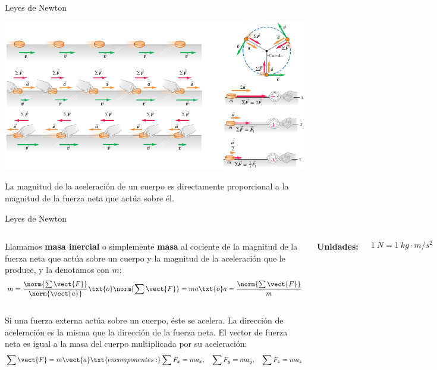 \documentclass[9pt, aspectratio=169]{beamer}
\begin{document}
\begin{frame}{Leyes de Newton}
    \begin{center} 
        \includegraphics[scale=0.90]{figs/fig-06.pdf}

        La magnitud de la aceleración de un cuerpo es directamente proporcional a la magnitud de la fuerza neta que actúa sobre él.
    \end{center}
\end{frame}

\begin{frame}{Leyes de Newton}
\begin{columns}
\cx 
\begin{definition}[Masa]
    Llamamos \textbf{masa inercial} o simplemente \textbf{masa} al cociente de la magnitud de la fuerza neta que actúa sobre un cuerpo y la magnitud de la aceleración que le produce, y la denotamos con $m$:
    \[ m = \frac{\norm{\sum \vect{F}}}{\norm{\vect{a}}} \txt{o} \norm{\sum \vect{F}} = m a \txt{o} a = \frac{\norm{\sum \vect{F}}}{m} \]
\end{definition}
\cx 
\textbf{Unidades:}

\[ \qty{1}{N} = \qty{1}{kg} \cdot \unit{m/s^2} \]

\end{columns}
\pause

\begin{definition}
    Si una fuerza externa actúa sobre un cuerpo, éste se acelera. La dirección de aceleración es la misma que la dirección de la fuerza neta. El vector de fuerza neta es igual a la masa del cuerpo multiplicada por su aceleración:
    \[ \sum \vect{F} = m \vect{a} \txt{en componentes:} \sum F_x = m a_x, \quad \sum F_y = m a_y, \quad  \sum F_z = m a_z \]
\end{definition}
\end{frame}
\end{document}
